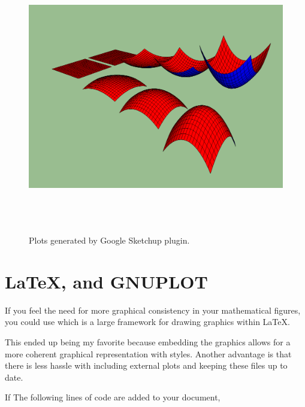 \begin{figure}[!ht]
  \begin{center}
    \includegraphics[width=12cm,height=12cm]{figures/rubyparabolas}
  \end{center}

  \caption{\small Plots generated by Google Sketchup plugin.}
  \label{fig-sketchup}
\end{figure}

\lstset{frame=single, basicstyle=\small}



\section{\LaTeX, \myindx{\TikZ} and GNUPLOT}
If you feel the need for more graphical consistency in your mathematical
figures, you could use \TikZ which is a large framework for drawing graphics
within \LaTeX.

This ended up being my favorite because embedding the graphics allows
for a more coherent graphical representation with styles. Another 
advantage is that there is less hassle with including external 
plots and keeping these files up to date.

If The following lines of code are added to your document,



